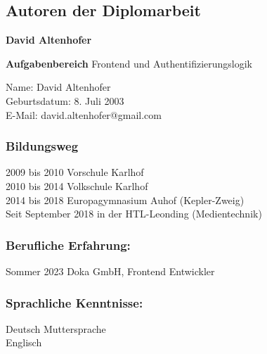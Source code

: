 \begin{spacing}{1}
    \chapter*{Autoren der Diplomarbeit}
  \end{spacing}

\textbf{David Altenhofer}

\textbf{Aufgabenbereich}
Frontend und Authentifizierungslogik

\begin{flushleft}
Name: David Altenhofer\\
Geburtsdatum: 8. Juli 2003\\
E-Mail: david.altenhofer@gmail.com
\end{flushleft}

\subsection*{Bildungsweg}
2009 bis 2010 Vorschule Karlhof\\
2010 bis 2014 Volkschule Karlhof\\
2014 bis 2018 Europagymnasium Auhof (Kepler-Zweig)\\
Seit September 2018 in der HTL-Leonding (Medientechnik) 

\subsection*{Berufliche Erfahrung:}
Sommer 2023 Doka GmbH, Frontend Entwickler

\subsection*{Sprachliche Kenntnisse:}
Deutsch Muttersprache\\
Englisch
